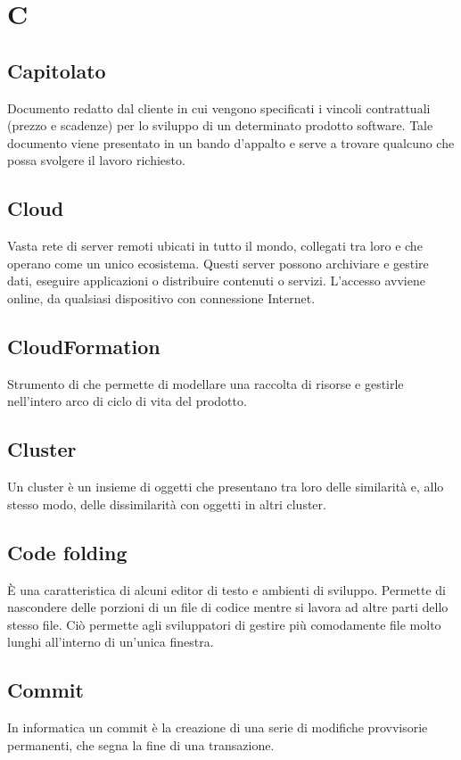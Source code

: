 \section*{C}
\markright{}

\subsection*{Capitolato}
Documento redatto dal cliente in cui vengono specificati i vincoli contrattuali (prezzo e scadenze) per lo sviluppo di un determinato prodotto software. Tale documento viene presentato in un bando d'appalto e serve a trovare qualcuno che possa svolgere il lavoro richiesto.

\subsection*{Cloud}
Vasta rete di server remoti ubicati in tutto il mondo, collegati tra loro e che operano come un unico ecosistema. Questi server possono archiviare e gestire dati, eseguire applicazioni o distribuire contenuti o servizi. L'accesso avviene online, da qualsiasi dispositivo con connessione Internet.

\subsection*{CloudFormation}
Strumento di  che permette di modellare una raccolta di risorse  e gestirle nell'intero arco di ciclo di vita del prodotto.

\subsection*{Cluster}
Un cluster è un insieme di oggetti che presentano tra loro delle similarità e, allo stesso modo, delle dissimilarità con oggetti in altri cluster.

\subsection*{Code folding}
È una caratteristica di alcuni editor di testo e ambienti di sviluppo. Permette di nascondere delle porzioni di un file di codice mentre si lavora ad altre parti dello stesso file. Ciò permette agli sviluppatori di gestire più comodamente file molto lunghi all'interno di un'unica finestra.

\subsection*{Commit}
In informatica un commit è la creazione di una serie di modifiche provvisorie permanenti, che segna la fine di una transazione.

